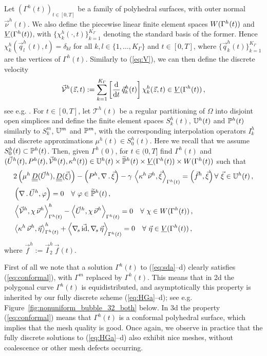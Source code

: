 Let $(\Gamma^h(t))_{t\in[0,T]}$ be a family of polyhedral surfaces, with
outer normal $\vec\nu^h(t)$.
We also define the piecewise linear finite element spaces $W(\Gamma^h(t))$ and $\underline{V}(\Gamma^h(t))$,
with $\{\chi^h_k(\cdot,t)\}_{k=1}^{K_\Gamma}$ denoting the standard basis of
the former. Hence
$\chi^h_k(\vec q^h_l(t),t) = \delta_{kl}$ for all $k,l \in
\{1,\ldots,K_\Gamma\}$ and $t \in [0,T]$, where
$\{\vec{q}^h_k(t)\}_{k=1}^{K_\Gamma}$ are the vertices of $\Gamma^h(t)$.
Similarly to (\ref{eq:V}), we can then define the discrete velocity
\begin{equation*}
\vec{\mathcal{V}}^h(\vec z, t):=
\sum_{k=1}^{K_\Gamma}\left[\frac{\rm d}{{\rm d}t}\,\vec q^h_k(t)\right] \chi^h_k(\vec z, t)
\in \underline{V}(\Gamma^h(t))\,,
\end{equation*}
see e.g. \cite[(3.3)]{tpfs}.
For $t\in
[0,T]$, let $\mathcal{T}^h(t)$ be a regular partitioning of $\Omega$ into
disjoint open simplices and define the finite element spaces $S^h_k(t)$,
$\mathbb{U}^h(t)$ and $\mathbb{P}^h(t)$ similarly to $S^m_k$, $\mathbb{U}^m$ and
$\mathbb{P}^m$, with the corresponding interpolation operators $I^h_k$ and discrete
approximations $\mu^h(t) \in S^h_0(t)$. Here we recall that we assume
$S_0^h(t)\subset\mathbb{P}^h(t)$. Then, given $\Gamma^h(0)$, for $t\in
(0,T]$ find $\Gamma^h(t)$ and $(\vec U^h(t), P^h(t), \vec{\mathcal{V}}^h(t),
\kappa^h(t)) \in \mathbb{U}^h(t) \times \widetilde{\mathbb{P}}^h(t) \times \underline{V}(\Gamma^h(t)) \times
W(\Gamma^h(t))$ such that
\begin{subequations}
\begin{align}
& 2\left(\mu^h\,\mat D(\vec U^h), \mat D(\vec \xi) \right)
- \left(P^h, \nabla\,.\,\vec \xi\right) - \gamma\,\left\langle
\kappa^h\,\vec\nu^h, \vec\xi\right\rangle_{\Gamma^h(t)} = \left(\vec f^h, \vec
\xi\right) \forall\ \vec\xi \in \uspace^h(t) \,, \label{eq:sda}\\
& \left(\nabla\,.\,\vec U^h, \varphi\right)  = 0
\quad \forall\ \varphi \in \pnormspace^h(t)\,, \label{eq:sdb} \\
& \left\langle \V^h , \chi\,\vec\nu^h
\right\rangle_{\Gamma^h(t)}^h - \left\langle \vec U^h, \chi\,\vec\nu^h
\right\rangle_{\Gamma^h(t)} = 0 \quad \forall\ \chi \in \Wht\,, \label{eq:sdc}
\\
& \left\langle \kappa^h\,\vec\nu^h, \vec\eta \right\rangle_{\Gamma^h(t)}^h
+ \left\langle \nabs\,\vec\id, \nabs\,\vec \eta \right\rangle_{\Gamma^h(t)} = 0
\quad \forall\ \vec\eta \in \Vht\,, \label{eq:sdd}
\end{align}
\end{subequations}
where $\vec f^h := \vec I^h_2\,\vec f(t)$.

First of all we note that a solution $\Gamma^h(t)$ to (\ref{eq:sda}--d) clearly
satisfies (\ref{eq:conformal}), with $\Gamma^m$ replaced by $\Gamma^h(t)$. This
means that in 2d the polygonal curve $\Gamma^h(t)$ is equidistributed, and
asymptotically this property is inherited by our fully discrete scheme
(\ref{eq:HGa}--d); see e.g. Figure~\ref{fig:nonuniform_bubble_32_both} below.
In 3d the property (\ref{eq:conformal}) means that $\Gamma^h(t)$ is a
conformal polyhedral surface, which implies that the mesh quality is good. Once
again, we observe in practice that the fully discrete solutions to
(\ref{eq:HGa}--d) also exhibit nice meshes, without coalescence or other
mesh defects occurring.

